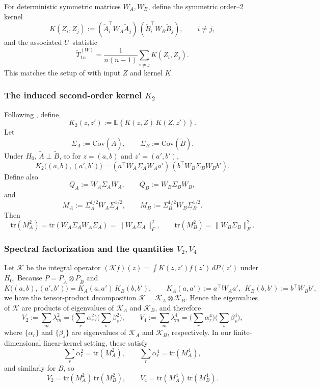 \documentclass[12pt,reqno,oneside]{amsbook}
\theoremstyle{definition}
\theoremstyle{remark}
\begin{document}
For deterministic symmetric matrices $W_A,W_B$, define the symmetric order--2
kernel
\[
K(Z_i,Z_j)
:=
(\tilde A_i^\top W_A \tilde A_j)\,
(\tilde B_i^\top W_B \tilde B_j),
\qquad i\neq j,
\]
and the associated $U$--statistic
\[
\tilde T_{1n}^{(W)}=\frac{1}{n(n-1)}\sum_{i\neq j}K(Z_i,Z_j).
\]
This matches the setup of \citet{HeZhongCuiMandrekar2023} with input $Z$ and
kernel $K$.

\subsubsection{The induced second-order kernel $K_2$}
Following \citet{HeZhongCuiMandrekar2023}, define
\[
K_2(z,z') := \mathbb E\!\left\{ K(z,Z)\,K(Z,z')\right\}.
\]
Let
\[
\Sigma_A:=\mbox{Cov}(\tilde A),\qquad
\Sigma_B:=\mbox{Cov}(\tilde B).
\]
Under $H_0$, $\tilde A\perp \tilde B$, so for $z=(a,b)$ and $z'=(a',b')$,
\[
K_2\big((a,b),(a',b')\big)
=
(a^\top W_A\Sigma_AW_A a')\,(b^\top W_B\Sigma_BW_B b').
\]
Define also
\[
Q_A:=W_A\Sigma_AW_A,\qquad Q_B:=W_B\Sigma_BW_B,
\]
and
\[
M_A:=\Sigma_A^{1/2}W_A\Sigma_A^{1/2},\qquad
M_B:=\Sigma_B^{1/2}W_B\Sigma_B^{1/2}.
\]
Then
\[
\mbox{tr}(M_A^2)=\mbox{tr}(W_A\Sigma_AW_A\Sigma_A)=\|W_A\Sigma_A\|_F^2,
\qquad
\mbox{tr}(M_B^2)=\|W_B\Sigma_B\|_F^2.
\]

\subsubsection{Spectral factorization and the quantities $V_2,V_4$}
Let $\mathcal K$ be the integral operator $(\mathcal K f)(z)=\int K(z,z')f(z')
\,dP(z')$ under $H_0$. Because $P=P_{\tilde A}\otimes P_{\tilde B}$ and
\[
K\big((a,b),(a',b')\big)=K_A(a,a')\,K_B(b,b'),
\qquad
K_A(a,a'):=a^\top W_A a',\ \ K_B(b,b'):=b^\top W_B b',
\]
we have the tensor-product decomposition $\mathcal K=\mathcal K_A\otimes\mathcal K_B$.
Hence the eigenvalues of $\mathcal K$ are products of eigenvalues of
$\mathcal K_A$ and $\mathcal K_B$, and therefore
\[
V_2:=\sum_m\lambda_m^2
=
\Big(\sum_r\alpha_r^2\Big)\Big(\sum_s\beta_s^2\Big),
\qquad
V_4:=\sum_m\lambda_m^4
=
\Big(\sum_r\alpha_r^4\Big)\Big(\sum_s\beta_s^4\Big),
\]
where $\{\alpha_r\}$ and $\{\beta_s\}$ are eigenvalues of $\mathcal K_A$ and
$\mathcal K_B$, respectively. In our finite-dimensional linear-kernel setting,
these satisfy
\[
\sum_r\alpha_r^2=\mbox{tr}(M_A^2),\qquad \sum_r\alpha_r^4=\mbox{tr}(M_A^4),
\]
and similarly for $B$, so
\[
V_2=\mbox{tr}(M_A^2)\,\mbox{tr}(M_B^2),
\qquad
V_4=\mbox{tr}(M_A^4)\,\mbox{tr}(M_B^4).
\]
\end{document}
